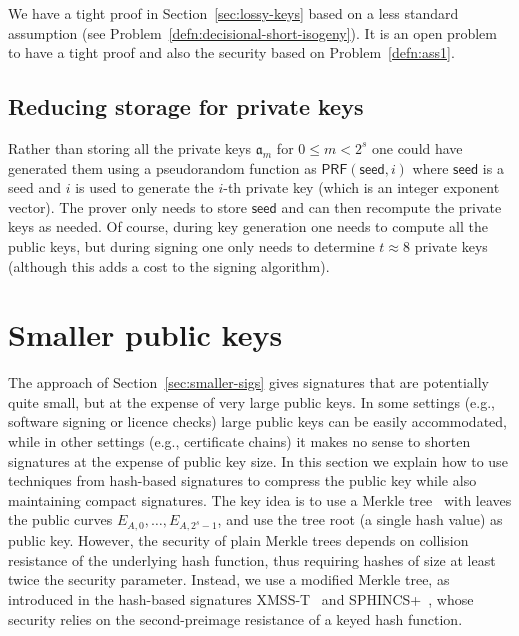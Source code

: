 \documentclass{llncs}
\newcommand{\seed}{\mathsf{seed}}
\renewcommand{\a}{\mathfrak{a}}
\newcommand{\PRF}{\mathsf{PRF}}
\begin{document}
We have a tight proof in Section~\ref{sec:lossy-keys} based on a less standard assumption (see Problem~\ref{defn:decisional-short-isogeny}). It is an open problem to have a tight proof and also the security based on Problem~\ref{defn:ass1}.





\subsection{Reducing storage for private keys}\label{sec:private-key-compress}

Rather than storing all the private keys $\a_m$ for $0 \le m < 2^s$ one could have generated them using a pseudorandom function as $\PRF( \seed, i )$ where $\seed$ is a seed and $i$ is used to generate the $i$-th private key (which is an integer exponent vector).
The prover only needs to store $\seed$ and can then recompute the private keys as needed.
Of course, during key generation one needs to compute all the public keys, but during signing one only needs to determine $t \approx 8$ private keys (although this adds a cost to the signing algorithm).




\section{Smaller public keys} \label{sec:smaller-keys}

The approach of Section~\ref{sec:smaller-sigs} gives signatures that are potentially quite small, but at the expense of very large public keys. In some settings (e.g., software signing or licence checks) large public keys can be easily accommodated, while in other settings (e.g., certificate chains) it makes no sense to shorten signatures at the expense of public key size.
In this section we explain how to use techniques from hash-based signatures to compress the public key while also maintaining compact signatures.
The key idea is to use a Merkle tree~\cite{10.1007/0-387-34805-0_21} with leaves the public curves $E_{A,0}, \dots, E_{A,2^s-1}$, and use the tree root (a single hash value) as public key.
However, the security of plain Merkle trees depends on collision resistance of the underlying hash function, thus requiring hashes of size at least twice the security parameter.
Instead, we use a modified Merkle tree, as introduced in the hash-based signatures XMSS-T~\cite{10.1007/978-3-662-49384-7_15} and SPHINCS+~\cite{sphincs+}, whose security relies on the second-preimage resistance of a keyed hash function.
\end{document}
